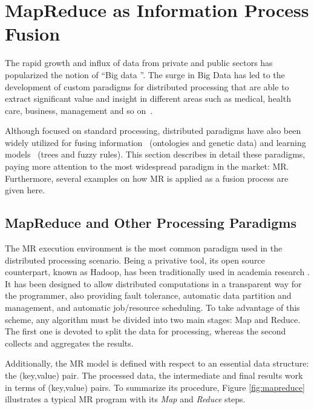 \documentclass[3p,review]{elsarticle}
\begin{document}
\section{MapReduce as Information Process Fusion}\label{sec:mr}

The rapid growth and influx of data from private and public sectors has popularized the notion of ``Big data \cite{Fer14}''. The surge in Big Data has led to the development of custom paradigms for distributed processing that are able to extract significant value and insight in different areas such as medical, health care, business, management and so on~\cite{Kam14,Chen14,wu14}. 

Although focused on standard processing, distributed paradigms have also been widely utilized for fusing information~\cite{zhang14b, meng15} (ontologies and genetic data) and learning models~\cite{rio14b, rio15b} (trees and fuzzy rules). This section describes in detail these paradigms, paying more attention to the most widespread paradigm in the market: MR. Furthermore, several examples on how MR is applied as a fusion process are given here.

\subsection{MapReduce and Other Processing Paradigms}\label{subsec:mr}


The MR execution environment \cite{Dea08} is the most common paradigm used in the distributed processing scenario. Being a privative tool, its open source counterpart, known as Hadoop, has been traditionally used in academia research \cite{Whi15-Hadoop}. It has been designed to allow distributed computations in a transparent way for the programmer, also providing fault tolerance, automatic data partition and management, and automatic job/resource scheduling. To take advantage of this scheme, any algorithm must be divided into two main stages: Map and Reduce. The first one is devoted to split the data for processing, whereas the second collects and aggregates the results.

Additionally, the MR model is defined with respect to an essential data structure: the (key,value) pair. The processed data, the intermediate and final results work in terms of (key,value) pairs. To summarize its procedure, Figure \ref{fig:mapreduce} illustrates a typical MR program with its \textit{Map} and \textit{Reduce} steps. %
\end{document}
